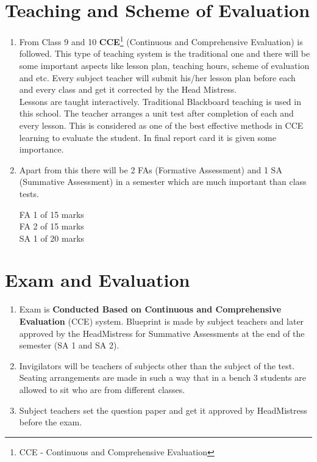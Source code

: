 \section{Teaching and Scheme of Evaluation}
\begin{enumerate}
    \item From Class 9 and 10 \textbf{CCE}\footnote{CCE - Continuous and Comprehensive Evaluation} (Continuous and Comprehensive Evaluation) is followed. This type of teaching system is the traditional one and there will be some important aspects like lesson plan, teaching hours, scheme of evaluation and etc. Every subject teacher will submit his/her lesson plan before each and every class and get it corrected by the Head Mistress.\\
    
    Lessons are taught interactively. Traditional Blackboard teaching is used in this school. The teacher arranges a unit test after completion of each and every lesson. This is considered as one of the best effective methods in CCE learning to evaluate the student. In final report card it is given some importance.

\item Apart from this there will be 2 FAs (Formative Assessment) and 1 SA (Summative Assessment) in a semester which are much important than class tests. 

\begin{tcolorbox}[coltitle=black,colframe=yellow!90,fonttitle=\sffamily\bfseries\large,title=Division of Marks]
 FA 1 of 15 marks\\
 FA 2 of 15 marks \\
 SA 1 of 20 marks
\end{tcolorbox}
\end{enumerate}
    
\section{Exam and Evaluation}
\begin{enumerate}
\item Exam is \textbf{Conducted Based on Continuous and Comprehensive 
Evaluation} (CCE) system. Blueprint is made by subject teachers and 
later approved by the HeadMistress for Summative Assessments at the end of 
the semester (SA 1 and SA 2).
\item Invigilators will be teachers of subjects other than the subject of the test. Seating arrangements are made in such a way that in a bench 3 
students are allowed to sit who are from different classes. 
\item Subject teachers set the question paper and get it approved by HeadMistress before the exam. 
\end{enumerate}

